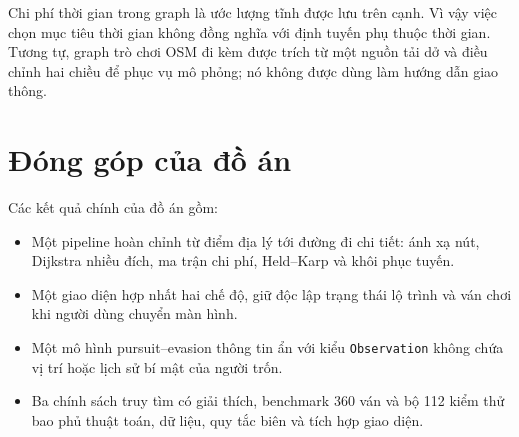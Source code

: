 Chi phí thời gian trong graph là ước lượng tĩnh được lưu trên cạnh. Vì vậy việc
chọn mục tiêu thời gian không đồng nghĩa với định tuyến phụ thuộc thời gian.
Tương tự, graph trò chơi OSM đi kèm được trích từ một nguồn tải dở và điều chỉnh
hai chiều để phục vụ mô phỏng; nó không được dùng làm hướng dẫn giao thông.

\section{Đóng góp của đồ án}

Các kết quả chính của đồ án gồm:
\begin{itemize}
  \item Một pipeline hoàn chỉnh từ điểm địa lý tới đường đi chi tiết: ánh xạ nút,
  Dijkstra nhiều đích, ma trận chi phí, Held--Karp và khôi phục tuyến.
  \item Một giao diện hợp nhất hai chế độ, giữ độc lập trạng thái lộ trình và ván
  chơi khi người dùng chuyển màn hình.
  \item Một mô hình pursuit--evasion thông tin ẩn với kiểu \texttt{Observation}
  không chứa vị trí hoặc lịch sử bí mật của người trốn.
  \item Ba chính sách truy tìm có giải thích, benchmark 360 ván và bộ 112 kiểm
  thử bao phủ thuật toán, dữ liệu, quy tắc biên và tích hợp giao diện.
\end{itemize}

